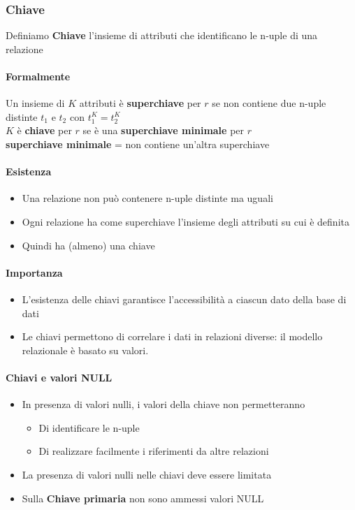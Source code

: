 \documentclass[12pt,a4paper]{article}
\begin{document}
\subsubsection{Chiave}
Definiamo \textbf{Chiave} l'insieme di attributi che identificano le n-uple di una relazione

\paragraph{Formalmente\\}
Un insieme di $K$ attributi è \textbf{superchiave} per $r$ se non contiene due n-uple distinte $t_1$ e $t_2$ con $t_1^K = t_2^K$\\
$K$ è \textbf{chiave} per $r$ se è una \textbf{superchiave minimale} per $r$\\
\textbf{superchiave minimale} = non contiene un'altra superchiave

\paragraph{Esistenza\\}
\begin{itemize}
\item Una relazione non può contenere n-uple distinte ma uguali
\item Ogni relazione ha come superchiave l’insieme degli attributi su cui è definita
\item Quindi ha (almeno) una chiave
\end{itemize}

\paragraph{Importanza\\}
\begin{itemize}
\item L'esistenza delle chiavi garantisce l'accessibilità a ciascun dato della base di dati
\item Le chiavi permettono di correlare i dati in relazioni diverse: il modello relazionale è basato su valori.
\end{itemize}

\paragraph{Chiavi e valori NULL\\}
\begin{itemize}
\item In presenza di valori nulli, i valori della chiave non permetteranno
\begin{itemize}
\item Di identificare le n-uple
\item Di realizzare facilmente i riferimenti da altre relazioni
\end{itemize}
\item La presenza di valori nulli nelle chiavi deve essere limitata
\item Sulla \textbf{Chiave primaria} non sono ammessi valori NULL
\end{itemize}
\end{document}
